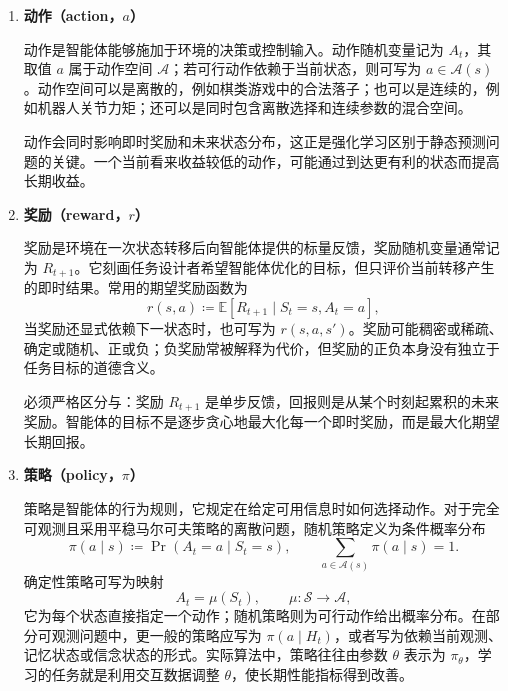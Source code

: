 \documentclass[UTF8,12pt,a4paper,fontset=fandol]{ctexbook}
\begin{document}
\begin{enumerate}[label=\textbf{\arabic*.},leftmargin=3em]
  在完全可观测的马尔可夫决策过程中，智能体能够获得足以确定马尔可夫状态的信息，通常简写为 $O_t=S_t$。在部分可观测的情形下，单个观测不足以预测未来，问题应建模为部分可观测马尔可夫决策过程。此时策略一般需要依赖历史 $H_t$，或者依赖关于隐状态的信念分布
  \[
    b_t(s)=\Pr(S_t=s\mid H_t).
  \]
  因此，，二者不能在一般情形下混为一谈。


  \item \textbf{动作（action，$a$）}


  动作是智能体能够施加于环境的决策或控制输入。动作随机变量记为 $A_t$，其取值 $a$ 属于动作空间 $\mathcal{A}$；若可行动作依赖于当前状态，则可写为 $a\in\mathcal{A}(s)$。动作空间可以是离散的，例如棋类游戏中的合法落子；也可以是连续的，例如机器人关节力矩；还可以是同时包含离散选择和连续参数的混合空间。


  动作会同时影响即时奖励和未来状态分布，这正是强化学习区别于静态预测问题的关键。一个当前看来收益较低的动作，可能通过到达更有利的状态而提高长期收益。


  \item \textbf{奖励（reward，$r$）}


  奖励是环境在一次状态转移后向智能体提供的标量反馈，奖励随机变量通常记为 $R_{t+1}$。它刻画任务设计者希望智能体优化的目标，但只评价当前转移产生的即时结果。常用的期望奖励函数为
  \[
    r(s,a)
    \coloneqq \mathbb{E}\!\left[R_{t+1}\mid S_t=s,A_t=a\right],
  \]
  当奖励还显式依赖下一状态时，也可写为 $r(s,a,s')$。奖励可能稠密或稀疏、确定或随机、正或负；负奖励常被解释为代价，但奖励的正负本身没有独立于任务目标的道德含义。


  必须严格区分与：奖励 $R_{t+1}$ 是单步反馈，回报则是从某个时刻起累积的未来奖励。智能体的目标不是逐步贪心地最大化每一个即时奖励，而是最大化期望长期回报。


  \item \textbf{策略（policy，$\pi$）}


  策略是智能体的行为规则，它规定在给定可用信息时如何选择动作。对于完全可观测且采用平稳马尔可夫策略的离散问题，随机策略定义为条件概率分布
  \[
    \pi(a\mid s)
    \coloneqq \Pr(A_t=a\mid S_t=s),
    \qquad
    \sum_{a\in\mathcal{A}(s)}\pi(a\mid s)=1.
  \]
  确定性策略可写为映射
  \[
    A_t=\mu(S_t),
    \qquad \mu:\mathcal{S}\to\mathcal{A},
  \]
  它为每个状态直接指定一个动作；随机策略则为可行动作给出概率分布。在部分可观测问题中，更一般的策略应写为 $\pi(a\mid H_t)$，或者写为依赖当前观测、记忆状态或信念状态的形式。实际算法中，策略往往由参数 $\theta$ 表示为 $\pi_\theta$，学习的任务就是利用交互数据调整 $\theta$，使长期性能指标得到改善。
\end{enumerate}
\end{document}
